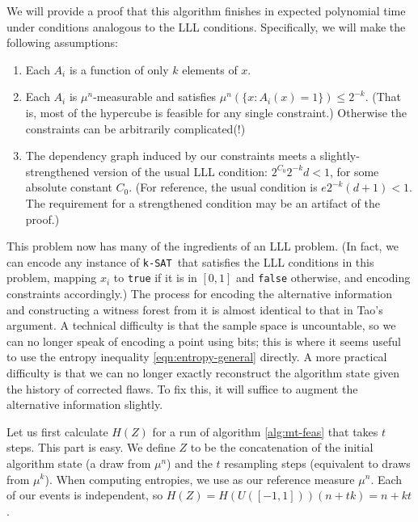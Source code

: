 \documentclass[twocolumn]{article}
\newcommand{\ksat}{\texttt{k-SAT}~}
\begin{document}
We will provide a proof that this algorithm finishes in expected polynomial time under conditions analogous to the LLL conditions.  Specifically, we will make the following assumptions:
\begin{enumerate}
  \item Each $A_i$ is a function of only $k$ elements of $x$.  \label{eqn:feas-sparsity-condition}
  \item Each $A_i$ is $\mu^n$-measurable and satisfies $\mu^n(\{x: A_i(x) = 1\}) \leq 2^{-k}$.  (That is, most of the hypercube is feasible for any single constraint.)  Otherwise the constraints can be arbitrarily complicated(!)  \label{eqn:feas-margprob-condition}
  \item The dependency graph induced by our constraints meets a slightly-strengthened version of the usual LLL condition: $2^{C_0} 2^{-k} d < 1$, for some absolute constant $C_0$.  (For reference, the usual condition is $e 2^{-k} (d + 1) < 1$.  The requirement for a strengthened condition may be an artifact of the proof.) \label{eqn:feas-lowdep-condition}
\end{enumerate}

This problem now has many of the ingredients of an LLL problem.  (In fact, we can encode any instance of \ksat that satisfies the LLL conditions in this problem, mapping $x_i$ to \texttt{true} if it is in $[0,1]$ and \texttt{false} otherwise, and encoding constraints accordingly.)  The process for encoding the alternative information and constructing a witness forest from it is almost identical to that in Tao's argument.  A technical difficulty is that the sample space is uncountable, so we can no longer speak of encoding a point using bits; this is where it seems useful to use the entropy inequality \ref{eqn:entropy-general} directly.  A more practical difficulty is that we can no longer exactly reconstruct the algorithm state given the history of corrected flaws.  To fix this, it will suffice to augment the alternative information slightly.

Let us first calculate $H(Z)$ for a run of algorithm \ref{alg:mt-feas} that takes $t$ steps.  This part is easy.  We define $Z$ to be the concatenation of the initial algorithm state (a draw from $\mu^n$) and the $t$ resampling steps (equivalent to draws from $\mu^k$).  When computing entropies, we use as our reference measure $\mu^n$.  Each of our events is independent, so $H(Z) = H(U([-1,1])) (n + t k) = n + k t$.
\end{document}

